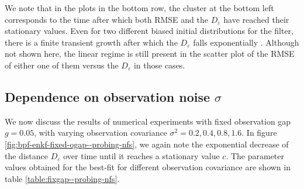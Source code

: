 We note that in the plots in the bottom row, the cluster at the bottom left corresponds to the time after which both RMSE and the $D_\varepsilon$ have reached their stationary values. Even for two different biased initial distributions for the filter, there is a finite transient growth after which the $D_\varepsilon$ falls exponentially \cite{mandal2021stability}. Although not shown here, the linear regime is still present in the scatter plot of the RMSE of either one of them versus the $D_\varepsilon$ in those cases. 

\subsection{Dependence on observation noise $\sigma$ }

We now discuss the results of numerical experiments with fixed observation gap $g = 0.05$, with varying observation covariance $\sigma^2 = 0.2, 0.4, 0.8, 1.6$. In figure \ref{fig:bpf-enkf-fixed-ogap--probing-nfs}, we again note the exponential decrease of the distance $D_\varepsilon$ over time until it reaches a stationary value $c$. The parameter values obtained for the best-fit for different observation covariance are shown in table \ref{table:fixgap--probing-nfs}.




